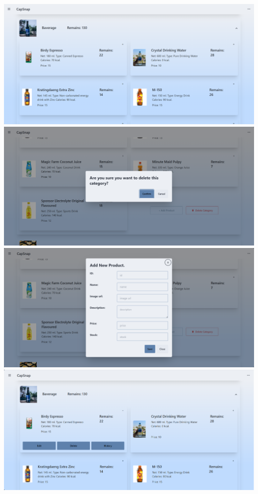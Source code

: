 {
\includegraphics[scale=0.35]{pic/ui/w8.png}
}\\
{
\includegraphics[scale=0.35]{pic/ui/w9.png}
}\\
{
\includegraphics[scale=0.35]{pic/ui/w10.png}
}\\
{
\includegraphics[scale=0.35]{pic/ui/w11.png}
}\\
